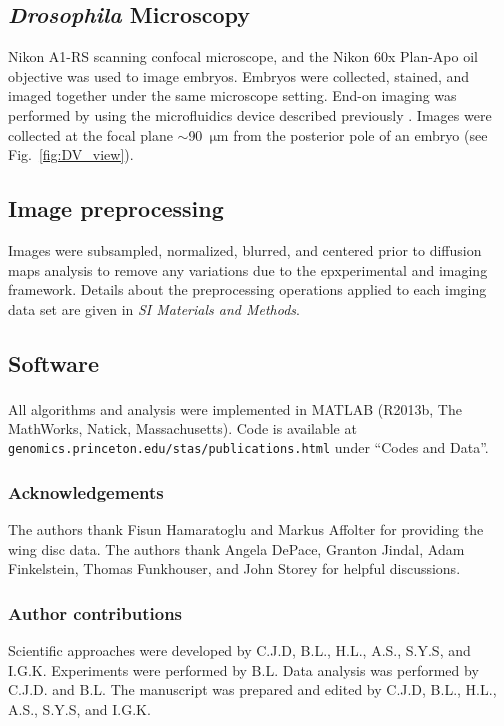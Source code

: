 \documentclass[twocolumn, 10pt]{article}
\newcommand{\SI}[0]{\textit{SI Materials and Methods}}
\newcommand{\fig}[0]{Fig.}
\begin{document}
\subsection*{{\em Drosophila} Microscopy}
%
Nikon A1-RS scanning confocal microscope, and the Nikon 60x Plan-Apo oil objective was used to image embryos. 
%
Embryos were collected, stained, and imaged together under the same microscope setting. 
%
End-on imaging was performed by using the microfluidics device described previously \citep{chung2010microfluidic}.
%
Images were collected at the focal plane $\sim$90~$\mathrm{\mu m}$ from the posterior pole of an embryo (see \fig~\ref{fig:DV_view}).  

\subsection*{Image preprocessing}

Images were subsampled, normalized, blurred, and centered prior to diffusion maps analysis to remove any variations due to the epxperimental and imaging framework. 
%
Details about the preprocessing operations applied to each imging data set are given in \SI. 


\subsection*{Software}
%
All algorithms and analysis were implemented in MATLAB\textsuperscript{\textregistered} (R2013b, The MathWorks, Natick, Massachusetts).
%
Code is available at \texttt{genomics.princeton.edu/stas/publications.html} under ``Codes and Data''. 




\subsubsection*{Acknowledgements}

The authors thank Fisun Hamaratoglu and Markus Affolter for providing the wing disc data. 
%
The authors thank Angela DePace, Granton Jindal, Adam Finkelstein,  Thomas Funkhouser, and John Storey for helpful discussions. 


\subsubsection*{Author contributions}
Scientific approaches were developed by C.J.D, B.L., H.L., A.S., S.Y.S, and I.G.K.
%
Experiments were performed by B.L.
%
Data analysis was performed by C.J.D. and B.L.
%
The manuscript was prepared and edited by C.J.D, B.L., H.L., A.S., S.Y.S, and I.G.K.
\end{document}
